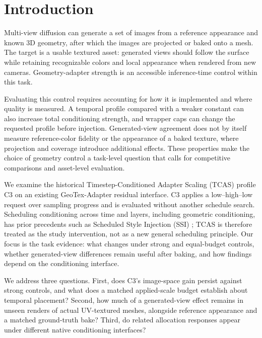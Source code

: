 \documentclass[times,twocolumn,final]{elsarticle}
\begin{document}
\raggedbottom
\linenumbers

\section{Introduction}
\label{sec:intro}

Multi-view diffusion can generate a set of images from a reference appearance and known 3D geometry, after which the images are projected or baked onto a mesh. The target is a usable textured asset: generated views should follow the surface while retaining recognizable colors and local appearance when rendered from new cameras. Geometry-adapter strength is an accessible inference-time control within this task.

Evaluating this control requires accounting for how it is implemented and where quality is measured. A temporal profile compared with a weaker constant can also increase total conditioning strength, and wrapper caps can change the requested profile before injection. Generated-view agreement does not by itself measure reference-color fidelity or the appearance of a baked texture, where projection and coverage introduce additional effects. These properties make the choice of geometry control a task-level question that calls for competitive comparisons and asset-level evaluation.

We examine the historical Timestep-Conditioned Adapter Scaling (TCAS) profile C3 on an existing GeoTex-Adapter residual interface. C3 applies a low--high--low request over sampling progress and is evaluated without another schedule search. Scheduling conditioning across time and layers, including geometric conditioning, has prior precedents such as Scheduled Style Injection (SSI) \cite{kulkarni2026ssi}; TCAS is therefore treated as the study intervention, not as a new general scheduling principle. Our focus is the task evidence: what changes under strong and equal-budget controls, whether generated-view differences remain useful after baking, and how findings depend on the conditioning interface.

We address three questions. First, does C3's image-space gain persist against strong controls, and what does a matched applied-scale budget establish about temporal placement? Second, how much of a generated-view effect remains in unseen renders of actual UV-textured meshes, alongside reference appearance and a matched ground-truth bake? Third, do related allocation responses appear under different native conditioning interfaces?
\end{document}
